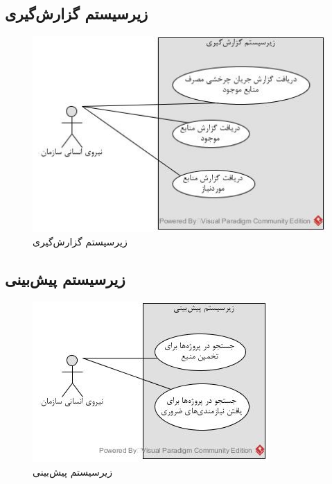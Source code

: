 \subsection{زیرسیستم گزارش‌گیری}
\begin{figure}[H]
	\centering
	\includegraphics[scale=1]{img/usecase/report}
	\caption{زیرسیستم گزارش‌گیری}
\end{figure}

\subsection{زیرسیستم پیش‌بینی}
\begin{figure}[H]
	\centering
	\includegraphics[scale=1]{img/usecase/est}
	\caption{زیرسیستم پیش‌بینی}
\end{figure}

